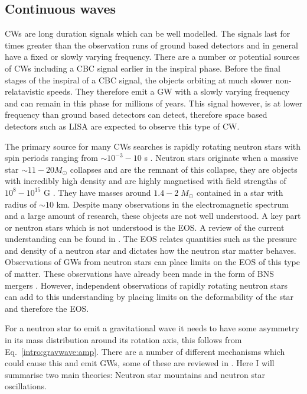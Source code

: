 \subsection{\label{intro:sources:cw}Continuous waves}

\glspl{CW} are long duration signals which can be well modelled.
The signals last for times greater than the observation runs of ground based detectors and in general have a fixed or slowly varying frequency.
There are a number or potential sources of \glspl{CW} including a \gls{CBC} signal earlier in the inspiral phase.
Before the final stages of the inspiral of a \gls{CBC} signal, the objects orbiting at much slower non-relatavistic speeds. They therefore emit a \gls{GW} with a slowly varying frequency and can remain in this phase for millions of years. 
This signal however, is at lower frequency than ground based detectors can detect, therefore space based detectors such as \gls{LISA} \citep{danzmann1996LISALaser} are expected to observe this type of \gls{CW}.

The primary source for many \glspl{CW} searches is rapidly rotating neutron stars with spin periods ranging from $\sim 10^{-3} - 10$ s \citep{manchester2005AustraliaTelescope}.
Neutron stars originate when a massive star $\sim 11 - 20 M_{\odot}$ collapses and are the remnant of this collapse, they are objects with incredibly high density and are highly magnetised with field strengths of $10^8 - 10^{15}$ G \citep{konar2017MagneticFields}.
They have masses around $1.4-2 \; M_{\odot}$ contained in a star with radius of $\sim 10$ km.
Despite many observations in the electromagnetic spectrum and a large amount of research, these objects are not well understood.
A key part or neutron stars which is not understood is the \gls{EOS}. A review of the current understanding can be found in \cite{lattimer2016EquationState}.
The \gls{EOS} relates quantities such as the pressure and density of a neutron star and dictates how the neutron star matter behaves.
Observations of \glspl{GW} from neutron stars can place limits on the \gls{EOS} of this type of matter. 
These observations have already been made in the form of \gls{BNS} mergers \citep{abbott2017GW170817Observation}.
However, independent observations of rapidly rotating neutron stars can add to this understanding by placing limits on the deformability of the star and therefore the \gls{EOS}.

For a neutron star to emit a gravitational wave it needs to have some asymmetry in its mass distribution around its rotation axis, this follows from Eq.~\ref{intro:gravwave:amp}. 
There are a number of different mechanisms which could cause this and emit \glspl{GW}, some of these are reviewed in \citep{glampedakis2017GravitationalWaves,riles2017RecentSearches,haskell2015DetectingGravitational,lasky2015GravitationalWaves}.
Here I will summarise two main theories: Neutron star mountains and neutron star oscillations.


